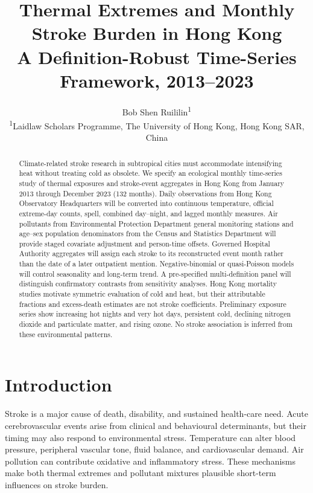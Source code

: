 \documentclass[11pt,a4paper]{article}
\title{\vspace{-1.5em}\textbf{Thermal Extremes and Monthly Stroke Burden in Hong Kong}\\
\large A Definition-Robust Time-Series Framework, 2013--2023}
\author{Bob Shen Ruililin\textsuperscript{1}\\[0.4em]
\small \textsuperscript{1}Laidlaw Scholars Programme, The University of Hong Kong, Hong Kong SAR, China}
\date{}
\begin{document}
\maketitle
\vspace{-1.4em}

\begin{abstract}
\noindent
Climate-related stroke research in subtropical cities must accommodate intensifying heat without treating cold as obsolete. We specify an ecological monthly time-series study of thermal exposures and stroke-event aggregates in Hong Kong from January 2013 through December 2023 (132 months). Daily observations from Hong Kong Observatory Headquarters will be converted into continuous temperature, official extreme-day counts, spell, combined day--night, and lagged monthly measures. Air pollutants from Environmental Protection Department general monitoring stations and age--sex population denominators from the Census and Statistics Department will provide staged covariate adjustment and person-time offsets. Governed Hospital Authority aggregates will assign each stroke to its reconstructed event month rather than the date of a later outpatient mention. Negative-binomial or quasi-Poisson models will control seasonality and long-term trend. A pre-specified multi-definition panel will distinguish confirmatory contrasts from sensitivity analyses. Hong Kong mortality studies motivate symmetric evaluation of cold and heat, but their attributable fractions and excess-death estimates are not stroke coefficients. Preliminary exposure series show increasing hot nights and very hot days, persistent cold, declining nitrogen dioxide and particulate matter, and rising ozone. No stroke association is inferred from these environmental patterns.
\end{abstract}

\section{Introduction}

Stroke is a major cause of death, disability, and sustained health-care need. Acute cerebrovascular events arise from clinical and behavioural determinants, but their timing may also respond to environmental stress. Temperature can alter blood pressure, peripheral vascular tone, fluid balance, and cardiovascular demand. Air pollution can contribute oxidative and inflammatory stress. These mechanisms make both thermal extremes and pollutant mixtures plausible short-term influences on stroke burden.
\end{document}
